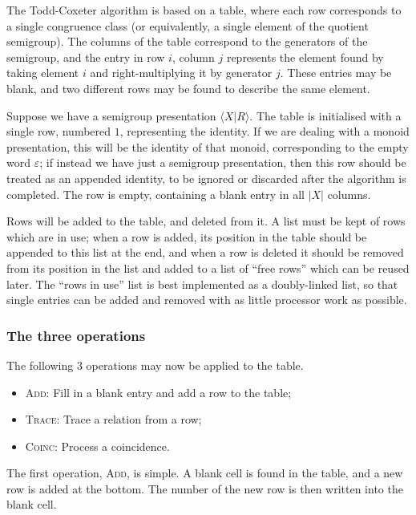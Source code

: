 The Todd-Coxeter algorithm is based on a table, where each row corresponds to a
single congruence class (or equivalently, a single element of the quotient
semigroup).  The columns of the table correspond to the generators of the
semigroup, and the entry in row $i$, column $j$ represents the element found by
taking element $i$ and right-multiplying it by generator $j$.  These entries may
be blank, and two different rows may be found to describe the same element.

Suppose we have a semigroup presentation $\langle X | R \rangle$.  The table is
initialised with a single row, numbered $1$, representing the identity.  If we
are dealing with a monoid presentation, this will be the identity of that
monoid, corresponding to the empty word $\varepsilon$; if instead we have just a
semigroup presentation, then this row should be treated as an appended identity,
to be ignored or discarded after the algorithm is completed.  The row is empty,
containing a blank entry in all $|X|$ columns.

Rows will be added to the table, and deleted from it.  A list must be kept of
rows which are in use; when a row is added, its position in the table should be
appended to this list at the end, and when a row is deleted it should be removed
from its position in the list and added to a list of ``free rows'' which can be
reused later.  The ``rows in use'' list is best implemented as a doubly-linked
list, so that single entries can be added and removed with as little processor
work as possible.

\subsubsection{The three operations}

The following 3 operations may now be applied to the table.

\begin{itemize}
\item \textsc{Add}: Fill in a blank entry and add a row to the table;
\item \textsc{Trace}: Trace a relation from a row;
\item \textsc{Coinc}: Process a coincidence.
\end{itemize}

The first operation, \textsc{Add}, is simple.  A blank cell is found in the
table, and a new row is added at the bottom.  The number of the new row is then
written into the blank cell.

